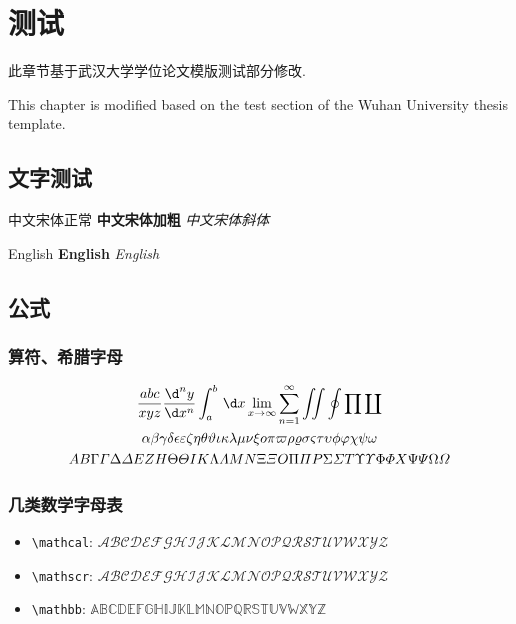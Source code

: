 \chapter{测试\the\baselineskip}

此章节基于武汉大学学位论文模版测试部分修改. \the\baselineskip

This chapter is modified based on the test section of the Wuhan University thesis template.

\section{文字测试\the\baselineskip}


中文宋体正常 \textbf{中文宋体加粗} \textit{中文宋体斜体}\the\baselineskip

English \textbf{English} \textit{English}\the\baselineskip

\section{公式\the\baselineskip}

\subsection{算符、希腊字母\the\baselineskip}
\begin{gather*}
    \frac{abc}{xyz} \frac{\d^n y}{\d x^n} \int_{a}^{b}  \,\d x \lim_{x \to \infty}  \sum_{n = 1}^{\infty}  \iint \oint \prod \coprod  \\
    \alpha\beta\gamma\delta \epsilon \varepsilon \zeta \eta \theta \vartheta \iota \kappa \lambda \mu \nu \xi o \pi \varpi \rho \varrho \sigma \varsigma \tau \upsilon \phi \varphi \chi \psi \omega\\
    A B \Gamma \varGamma \Delta \varDelta E Z H \Theta \varTheta I K \Lambda \varLambda M N \Xi \varXi O \Pi \varPi P \Sigma \varSigma T \Upsilon \varUpsilon \Phi \varPhi X \Psi \varPsi \Omega \varOmega
\end{gather*}

\subsection{几类数学字母表\the\baselineskip}

\begin{itemize}
    \item \verb|\mathcal|: $\mathcal{ABCDEFGHIJKLMNOPQRSTUVWXYZ}$ \the\baselineskip
    \item \verb|\mathscr|: $\mathscr{ABCDEFGHIJKLMNOPQRSTUVWXYZ}$ \the\baselineskip
    \item \verb|\mathbb|: $\mathbb{ABCDEFGHIJKLMNOPQRSTUVWXYZ}$ \the\baselineskip
\end{itemize}


